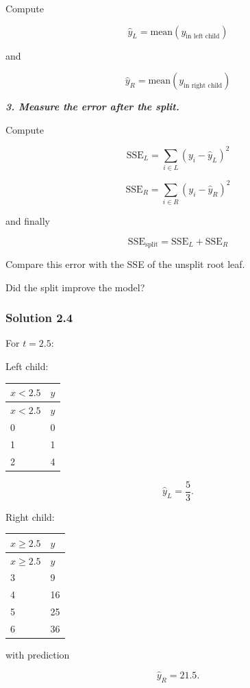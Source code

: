 \documentclass[10pt]{article}
\begin{document}
Compute

\[
\hat y_L = \mathrm{mean}(y_\text{in left child})
\]

and

\[
\hat y_R = \mathrm{mean}(y_\text{in right child})
\]

\textbf{\textit{3. Measure the error after the split.}}

Compute

\[
\mathrm{SSE}_L
=
\sum_{i\in L}(y_i-\hat y_L)^2
\]

\[
\mathrm{SSE}_R
=
\sum_{i\in R}(y_i-\hat y_R)^2
\]

and finally

\[
\mathrm{SSE}_{\mathrm{split}}
=
\mathrm{SSE}_L+\mathrm{SSE}_R
\]

Compare this error with the SSE of the unsplit root leaf.

Did the split improve the model?

\begingroup\color{red}

\subsubsection*{Solution 2.4}
For $t=2.5$:

Left child:

\begingroup
\small
\setlength{\tabcolsep}{4pt}
\begin{longtable}{l|l}
$x<2.5$ & $y$ \\
\hline
\endfirsthead
$x<2.5$ & $y$ \\
\hline
\endhead
0 & 0 \\[1.5pt]
1 & 1 \\[1.5pt]
2 & 4 \\[1.5pt]
\end{longtable}
\endgroup
\[
\hat y_L=\frac{5}{3}.
\]

Right child:

\begingroup
\small
\setlength{\tabcolsep}{4pt}
\begin{longtable}{l|l}
$x\geq 2.5$ & $y$ \\
\hline
\endfirsthead
$x\geq 2.5$ & $y$ \\
\hline
\endhead
3 & 9 \\[1.5pt]
4 & 16 \\[1.5pt]
5 & 25 \\[1.5pt]
6 & 36 \\[1.5pt]
\end{longtable}
\endgroup
with prediction

\[
\hat y_R=21.5.
\]
\end{document}
